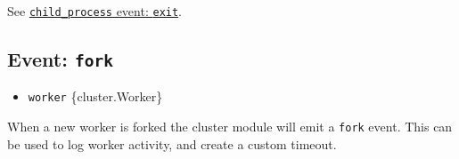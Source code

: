 See \href{child_process.md\#event-exit}{\texttt{child\_process} event:
\texttt{\textquotesingle{}exit\textquotesingle{}}}.

\subsection{\texorpdfstring{Event:
\texttt{\textquotesingle{}fork\textquotesingle{}}}{Event: \textquotesingle fork\textquotesingle{}}}\label{event-fork}

\begin{itemize}
\tightlist
\item
  \texttt{worker} \{cluster.Worker\}
\end{itemize}

When a new worker is forked the cluster module will emit a
\texttt{\textquotesingle{}fork\textquotesingle{}} event. This can be
used to log worker activity, and create a custom timeout.

\begin{Shaded}
\begin{Highlighting}[]
\OperatorTok{=}\NormalTok{ []}\OperatorTok{;}
 \NormalTok{() \{}
  \NormalTok{(}\NormalTok{)}\OperatorTok{;}
\NormalTok{\}}

\NormalTok{(}\OperatorTok{,}\KeywordTok{=\textgreater{}}\NormalTok{ \{}
\NormalTok{  timeouts[worker}\NormalTok{] }\OperatorTok{=} \OperatorTok{,} \NormalTok{)}\OperatorTok{;}
\NormalTok{\})}\OperatorTok{;}
\NormalTok{(}\OperatorTok{,}\OperatorTok{,}\KeywordTok{=\textgreater{}}\NormalTok{ \{}
  \NormalTok{(timeouts[worker}\NormalTok{])}\OperatorTok{;}
\NormalTok{\})}\OperatorTok{;}
\NormalTok{(}\OperatorTok{,}\OperatorTok{,}\OperatorTok{,}\KeywordTok{=\textgreater{}}\NormalTok{ \{}
  \NormalTok{(timeouts[worker}\NormalTok{])}\OperatorTok{;}
  \NormalTok{()}\OperatorTok{;}
\NormalTok{\})}\OperatorTok{;}
\end{Highlighting}
\end{Shaded}

